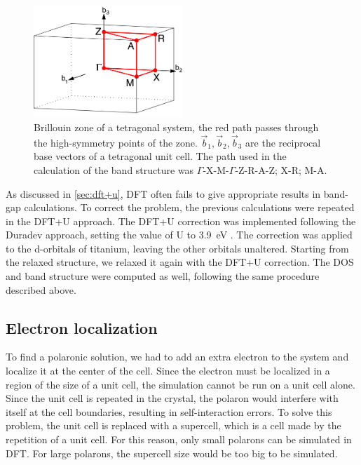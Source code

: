 \begin{figure}
    \centering
    \includegraphics[width=0.5\textwidth]{figures/brillouin_zone}
    \caption[Brillouin zone of a tetragonal system]{Brillouin zone of a tetragonal system, the red path passes through the high-symmetry points of the zone. $\vec{b}_1, \vec{b}_2, \vec{b}_3$ are the reciprocal base vectors of a tetragonal unit cell. The path used in the calculation of the band structure was $\Gamma$-X-M-$\Gamma$-Z-R-A-Z; X-R; M-A.}
    \label{fig:symmetry_points}
\end{figure}

As discussed in \cref{sec:dft+u}, DFT often fails to give appropriate results in band-gap calculations. To correct the problem, the previous calculations were repeated in the DFT+U approach.  The DFT+U correction was implemented following the Duradev approach, setting the value of U to \SI{3.9}{eV} \cite{reticcioli2022}. The correction was applied to the d-orbitals of titanium, leaving the other orbitals unaltered. Starting from the relaxed structure, we relaxed it again with the DFT+U correction. The DOS and band structure were computed as well, following the same procedure described above.

\subsection{Electron localization}
To find a polaronic solution, we had to add an extra electron to the system and localize it at the center of the cell. Since the electron must be localized in a region of the size of a unit cell, the simulation cannot be run on a unit cell alone. Since the unit cell is repeated in the crystal, the polaron would interfere with itself at the cell boundaries, resulting in self-interaction errors. To solve this problem, the unit cell is replaced with a supercell, which is a cell made by the repetition of a unit cell. For this reason, only small polarons can be simulated in DFT. For large polarons, the supercell size would be too big to be simulated.

